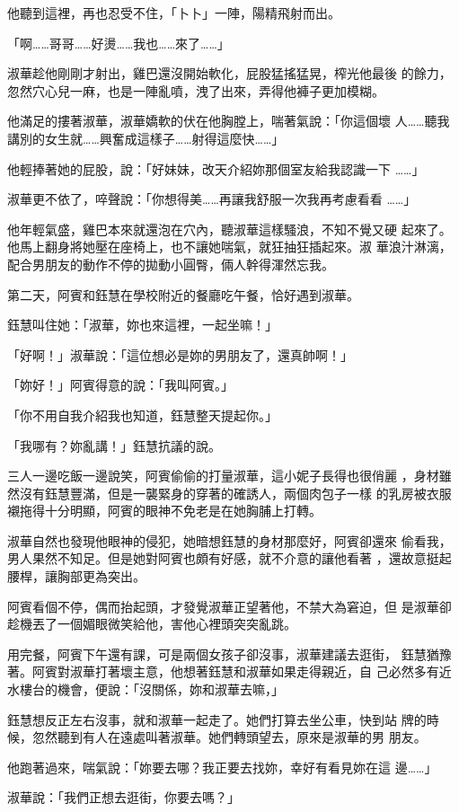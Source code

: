 他聽到這裡，再也忍受不住，「卜卜」一陣，陽精飛射而出。

「啊……哥哥……好燙……我也……來了……」

淑華趁他剛剛才射出，雞巴還沒開始軟化，屁股猛搖猛晃，榨光他最後
的餘力，忽然穴心兒一麻，也是一陣亂噴，洩了出來，弄得他褲子更加模糊。

他滿足的摟著淑華，淑華嬌軟的伏在他胸膛上，喘著氣說：「你這個壞
人……聽我講別的女生就……興奮成這樣子……射得這麼快……」

他輕捧著她的屁股，說：「好妹妹，改天介紹妳那個室友給我認識一下
……」

淑華更不依了，啐聲說：「你想得美……再讓我舒服一次我再考慮看看
……」

他年輕氣盛，雞巴本來就還泡在穴內，聽淑華這樣騷浪，不知不覺又硬
起來了。他馬上翻身將她壓在座椅上，也不讓她喘氣，就狂抽狂插起來。淑
華浪汁淋漓，配合男朋友的動作不停的拋動小圓臀，倆人幹得渾然忘我。

第二天，阿賓和鈺慧在學校附近的餐廳吃午餐，恰好遇到淑華。

鈺慧叫住她：「淑華，妳也來這裡，一起坐嘛！」

「好啊！」淑華說：「這位想必是妳的男朋友了，還真帥啊！」

「妳好！」阿賓得意的說：「我叫阿賓。」

「你不用自我介紹我也知道，鈺慧整天提起你。」

「我哪有？妳亂講！」鈺慧抗議的說。

三人一邊吃飯一邊說笑，阿賓偷偷的打量淑華，這小妮子長得也很俏麗
，身材雖然沒有鈺慧豐滿，但是一襲緊身的穿著的確誘人，兩個肉包子一樣
的乳房被衣服襯拖得十分明顯，阿賓的眼神不免老是在她胸脯上打轉。

淑華自然也發現他眼神的侵犯，她暗想鈺慧的身材那麼好，阿賓卻還來
偷看我，男人果然不知足。但是她對阿賓也頗有好感，就不介意的讓他看著
，還故意挺起腰桿，讓胸部更為突出。

阿賓看個不停，偶而抬起頭，才發覺淑華正望著他，不禁大為窘迫，但
是淑華卻趁機丟了一個媚眼微笑給他，害他心裡頭突突亂跳。

用完餐，阿賓下午還有課，可是兩個女孩子卻沒事，淑華建議去逛街，
鈺慧猶豫著。阿賓對淑華打著壞主意，他想著鈺慧和淑華如果走得親近，自
己必然多有近水樓台的機會，便說：「沒關係，妳和淑華去嘛，」

鈺慧想反正左右沒事，就和淑華一起走了。她們打算去坐公車，快到站
牌的時候，忽然聽到有人在遠處叫著淑華。她們轉頭望去，原來是淑華的男
朋友。

他跑著過來，喘氣說：「妳要去哪？我正要去找妳，幸好有看見妳在這
邊……」

淑華說：「我們正想去逛街，你要去嗎？」

